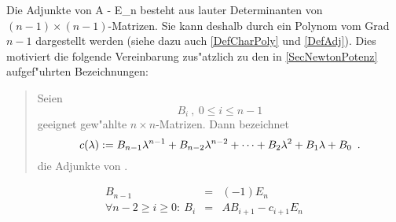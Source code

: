 Die Adjunkte von
    A - \lambda E_n
\Eeq 
besteht aus lauter Determinanten von $(n-1) \times (n-1)$-Matrizen. Sie
kann deshalb durch ein Polynom vom Grad $n-1$ dargestellt werden
(siehe dazu auch \ref{DefCharPoly} und \ref{DefAdj}).
Dies motiviert die folgende Vereinbarung zus"atzlich zu den in
\ref{SecNewtonPotenz} aufgef"uhrten Bezeichnungen:
\begin{quote}
    Seien \[ B_i \: , \: 0 \leq i \leq n-1 \] geeignet gew"ahlte 
    $n \times n$-Matrizen.
    Dann bezeichnet
    \[
       c(\lambda) := B_{n-1} \lambda^{n-1} + B_{n-2} \lambda^{n-2} + 
                     \cdots + B_2 \lambda^2 + B_1 \lambda + B_0 \mbox{\hspace{0.5em}.}
    \] die Adjunkte von .
\end{quote}

\begin{lemma}
\label{SatzFrame1}
    \begin{eqnarray*}
       B_{n-1} & = & (-1) E_n
    \\ \forall n-2 \geq i \geq 0 : \:
       B_{i} & = & A B_{i+1} - c_{i+1} E_n
    \end{eqnarray*}
\end{lemma}

